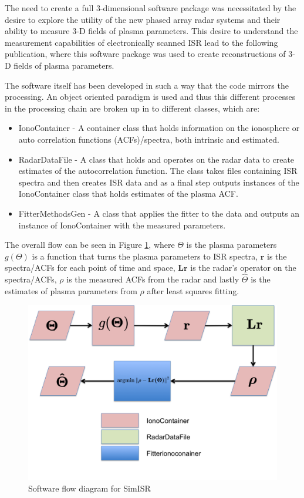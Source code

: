 The need to create a full 3-dimensional software package was necessitated by the desire to explore the utility of the new phased array radar systems and their ability to measure 3-D fields of plasma parameters. This desire to understand the measurement capabilities of electronically scanned ISR lead to the following publication, \citet{RDS:RDS20236} where this software package was used to create reconstructions of 3-D fields of plasma parameters.

The software itself has been developed in such a way that the code mirrors the processing. An object oriented paradigm is used and thus this different processes in the processing chain are broken up in to different classes, which are: 

\begin{itemize} 
\item IonoContainer - A container class that holds information on the ionosphere or auto correlation functions (ACFs)/spectra, both intrinsic and estimated.

\item RadarDataFile - A class that holds and operates on the radar data to create estimates of the autocorrelation function. The class takes files containing ISR spectra and then creates ISR data and as a final step outputs instances of the IonoContainer class that holds estimates of the plasma ACF.

\item FitterMethodsGen - A class that applies the fitter to the data and outputs an instance of IonoContainer with the measured parameters. 
\end{itemize}

The overall flow can be seen in Figure \ref{fig:swflow}, where  $\Theta$ is the plasma parameters $ g(\Theta)$ is a function that turns the plasma parameters to ISR spectra, $ \mathbf{r}$ is the spectra/ACFs for each point of time and space, $ \mathbf{Lr}$ is the radar's operator on the spectra/ACFs, $ \rho$ is the measured ACFs from the radar and lastly $ \hat{\Theta}$ is the estimates of plasma parameters from $ \rho$ after least squares fitting.

\begin{figure}[h!]
\centering
\includegraphics[width=5.0in]{softwareflowandmath}
\caption{Software flow diagram for SimISR}
\label{fig:swflow}
\end{figure}


